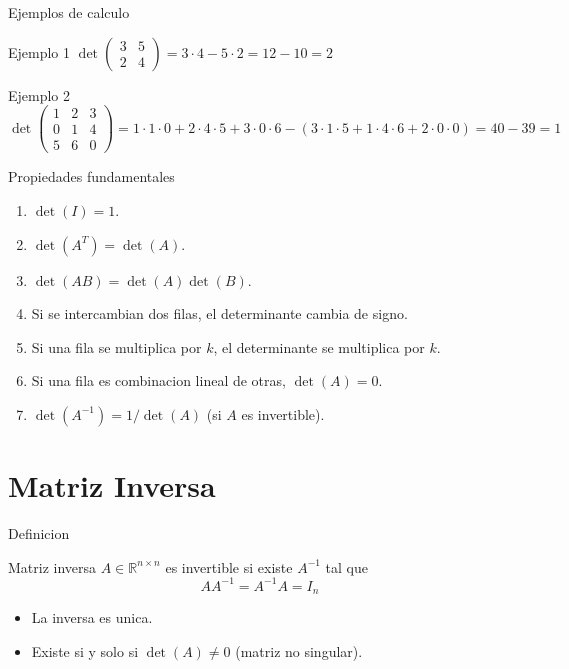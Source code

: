 \documentclass[aspectratio=169, 10pt, xcolor=table]{beamer}
\begin{document}
\begin{frame}{Ejemplos de calculo}
    \begin{exampleblock}{Ejemplo 1}
        $\det\begin{pmatrix}3&5\\2&4\end{pmatrix} = 3\cdot4 - 5\cdot2 = 12-10 = 2$
    \end{exampleblock}
    \begin{exampleblock}{Ejemplo 2}
        $\det\begin{pmatrix}1&2&3\\0&1&4\\5&6&0\end{pmatrix} = 1\cdot1\cdot0 + 2\cdot4\cdot5 + 3\cdot0\cdot6 - (3\cdot1\cdot5 + 1\cdot4\cdot6 + 2\cdot0\cdot0) = 40 - 39 = 1$
    \end{exampleblock}
\end{frame}

\begin{frame}{Propiedades fundamentales}
    \begin{enumerate}
        \item $\det(I) = 1$.
        \item $\det(A^T) = \det(A)$.
        \item $\det(AB) = \det(A)\det(B)$.
        \item Si se intercambian dos filas, el determinante cambia de signo.
        \item Si una fila se multiplica por $k$, el determinante se multiplica por $k$.
        \item Si una fila es combinacion lineal de otras, $\det(A) = 0$.
        \item $\det(A^{-1}) = 1/\det(A)$ (si $A$ es invertible).
    \end{enumerate}
\end{frame}

\section{Matriz Inversa}

\begin{frame}{Definicion}
    \begin{block}{Matriz inversa}
        $A\in\mathbb{R}^{n\times n}$ es invertible si existe $A^{-1}$ tal que
        \[
        AA^{-1} = A^{-1}A = I_n
        \]
    \end{block}
    \begin{itemize}
        \item La inversa es unica.
        \item Existe si y solo si $\det(A) \neq 0$ (matriz no singular).
    \end{itemize}
\end{frame}
\end{document}
